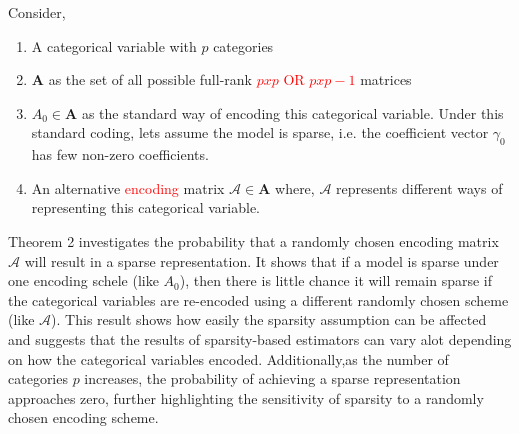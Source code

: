 Consider, 
\begin{enumerate}
    \item A categorical variable with $p$ categories 
    \item $\mathbf{A}$ as the set of all possible full-rank \textcolor{red}{$p x p$ OR $ p x p-1$ } matrices 
    \item $A_0 \in \mathbf{A}$ as the standard way of encoding this categorical variable. Under this standard coding, lets assume the model is sparse, i.e. the coefficient vector ${\gamma}_0$ has few non-zero coefficients.
    \item An alternative \textcolor{red}{encoding} matrix $\mathcal{A} \in \mathbf{A}$ where, $\mathcal{A}$ represents different ways of representing this categorical variable. 
\end{enumerate}
Theorem 2 investigates the probability that a randomly chosen encoding matrix $\mathcal{A}$ will result in a sparse representation. It shows that if a model is sparse under one encoding schele (like $A_0$), then there is little chance it will remain sparse if the categorical variables are re-encoded using a different randomly chosen scheme (like $\mathcal{A}$). This result shows how easily the sparsity assumption can be affected and suggests that the results of sparsity-based estimators can vary alot depending on how the categorical variables encoded. Additionally,as the number of categories $p$ increases, the probability of achieving a sparse representation approaches zero, further highlighting the sensitivity of sparsity to a randomly chosen encoding scheme.

